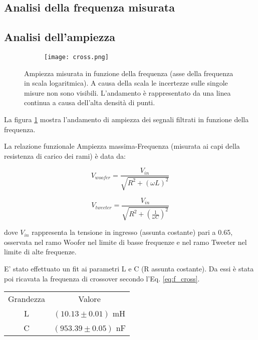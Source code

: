 \documentclass[../Relazione_circuiti]{subfiles}
\begin{document}
\subsection{Analisi della frequenza misurata}

\subsection{Analisi dell'ampiezza}

\begin{figure}[H]
\centering

\begin{subfigure}{=0.7\textwidth}

\texttt{[image: cross.png]}

\end{subfigure}

\caption{Ampiezza misurata in funzione della frequenza (asse della frequenza in scala logaritmica). A causa della scala le incertezze sulle singole misure non sono visibili. L'andamento è rappresentato da una linea continua a causa dell'alta densità di punti.}
\label{fig: cross_amplitude}

\end{figure}

La figura \ref{fig: cross_amplitude} mostra l'andamento di ampiezza dei segnali filtrati in funzione della frequenza. 

La relazione funzionale Ampiezza massima-Frequenza (misurata ai capi della resistenza di carico dei rami) è data da:

\begin{equation}
V_{woofer} = \frac{V_{in}}{\sqrt{R^2+(\omega L)^2}}
\end{equation}

\begin{equation}
V_{tweeter} = \frac{V_{in}}{\sqrt{R^2+(\frac{1}{\omega C})^2}}
\end{equation}

dove $V_{in}$ rappresenta la tensione in ingresso (assunta costante) pari a 0.65, osservata nel ramo Woofer nel limite di basse frequenze e nel ramo Tweeter nel limite di alte frequenze.

E' stato effettuato un fit ai parametri L e C (R assunta costante). Da essi è stata poi ricavata la frequenza di crossover secondo l'Eq. \ref{eq:f_cross}. 

\begin{tabular}{c | c }

Grandezza & Valore \\

L & $(10.13 \pm 0.01)$ mH \\
C & $(953.39 \pm 0.05)$ nF

\end{tabular}
\end{document}
